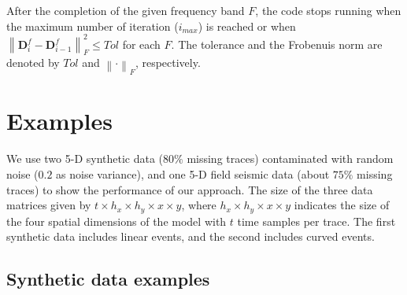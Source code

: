 After the completion of the given frequency band ${F}$,  the code stops running when the maximum number of iteration ({$i_{max}$}) is reached or when {$\left\|\mathbf{D}^f_i - \mathbf{D}^f_{i-1}\right\|_F^2\leq Tol$} for each ${F}$. The  tolerance and the Frobenuis norm are denoted by $Tol$ and {$\left\|\cdot\right\|_F$}, respectively.

\section{Examples}

We use two  5-D synthetic data  ($80\%$ missing traces) contaminated with random noise ($0.2$ as noise variance), and one 5-D field seismic data (about $75\%$ missing traces) to show the performance of our approach. The size of the three data matrices  given by $t\times h_{x}\times h_{y}\times x \times y$, where $ h_{x}\times h_{y}\times x \times y $ indicates the size of the four spatial dimensions of the model with $t$ time samples per trace. The first synthetic data  includes linear events, and the second includes curved events. 


\subsection{Synthetic data examples}

